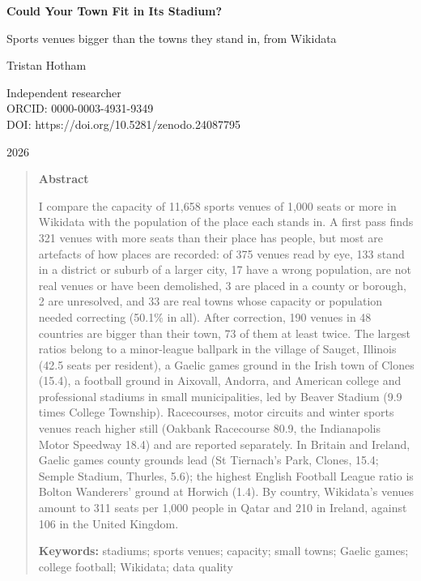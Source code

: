 \documentclass[11pt,a4paper]{article}
\begin{document}
\begin{center}
{\Large\bfseries Could Your Town Fit in Its Stadium?\par}
\vspace{0.4em}
{\large Sports venues bigger than the towns they stand in, from Wikidata\par}
\vspace{1.2em}
{\large Tristan Hotham\par}
\vspace{0.3em}
{\small Independent researcher\\
ORCID: 0000-0003-4931-9349\\
DOI: https://doi.org/10.5281/zenodo.24087795\par}
\vspace{0.8em}
2026
\end{center}

\begin{quote}
\small
\begin{center}\textbf{Abstract}\end{center}
I compare the capacity of 11,658 sports venues of 1,000 seats or more in Wikidata with the population of the place each stands in. A first pass finds 321 venues with more seats than their place has people, but most are artefacts of how places are recorded: of 375 venues read by eye, 133 stand in a district or suburb of a larger city, 17 have a wrong population, are not real venues or have been demolished, 3 are placed in a county or borough, 2 are unresolved, and 33 are real towns whose capacity or population needed correcting (50.1\% in all). After correction, 190 venues in 48 countries are bigger than their town, 73 of them at least twice. The largest ratios belong to a minor-league ballpark in the village of Sauget, Illinois (42.5 seats per resident), a Gaelic games ground in the Irish town of Clones (15.4), a football ground in Aixovall, Andorra, and American college and professional stadiums in small municipalities, led by Beaver Stadium (9.9 times College Township). Racecourses, motor circuits and winter sports venues reach higher still (Oakbank Racecourse 80.9, the Indianapolis Motor Speedway 18.4) and are reported separately. In Britain and Ireland, Gaelic games county grounds lead (St Tiernach's Park, Clones, 15.4; Semple Stadium, Thurles, 5.6); the highest English Football League ratio is Bolton Wanderers' ground at Horwich (1.4). By country, Wikidata's venues amount to 311 seats per 1,000 people in Qatar and 210 in Ireland, against 106 in the United Kingdom.

\textbf{Keywords:} stadiums; sports venues; capacity; small towns; Gaelic games; college football; Wikidata; data quality
\end{quote}
\end{document}
